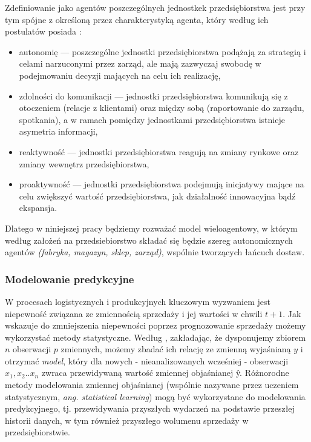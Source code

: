 \documentclass[polish, twoside, 12pt, a4paper]{article}
\theoremstyle{definition}
\theoremstyle{plain}
\theoremstyle{remark}
\begin{document}
Zdefiniowanie jako agentów poszczególnych jednostkek przedsiębiorstwa jest przy tym spójne z określoną przez \cite{Wooldridge1995} charakterystyką agenta, który według ich postulatów posiada : 

	\begin{itemize}
		\item autonomię --- poszczególne jednostki przedsiębiorstwa podążają za strategią i celami narzuconymi przez zarząd, ale mają zazwyczaj swobodę w podejmowaniu decyzji mających na celu ich realizację,
		\item zdolności do komunikacji --- jednostki przedsiębiorstwa komunikują się z otoczeniem (relacje z klientami) oraz między sobą (raportowanie do zarządu, spotkania), a w ramach pomiędzy jednostkami przedsiębiorstwa istnieje asymetria informacji,
		\item reaktywność --- jednostki przedsiębiorstwa reagują na zmiany rynkowe oraz zmiany wewnętrz przedsiębiorstwa,
	 	\item proaktywność --- jednostki przedsiębiorstwa podejmują inicjatywy mające na celu zwiększyć wartość przedsiębiorstwa, jak działalność innowacyjna bądź ekspansja. 
	\end{itemize}
 
 Dlatego w niniejszej pracy będziemy rozważać model wieloagentowy, w którym według założeń na przedsiebiorstwo składać się będzie szereg autonomicznych agentów \textit{(fabryka, magazyn, sklep, zarząd)}, wspólnie tworzących łańcuch dostaw.

\subsubsection{Modelowanie predykcyjne} \label{chapter:statistical} 
W procesach logistycznych i produkcyjnych kluczowym wyzwaniem jest niepewność związana ze zmiennością sprzedaży i jej wartości w chwili $t+1$. Jak wskazuje \cite{James2013} do zmniejszenia niepewności poprzez prognozowanie sprzedaży możemy wykorzystać metody statystyczne. Według \cite{James2013}, zakładając, że dysponujemy zbiorem $n$ obserwacji $p$ zmiennych, możemy zbadać ich relację ze zmienną wyjaśnianą $y$ i otrzymać \textit{model}, który dla nowych - nieanalizowanych wcześniej - obserwacji $x_1,x_2..x_n$  zwraca przewidywaną wartość zmiennej objaśnianej \^{y}. Różnorodne metody modelowania zmiennej objaśnianej (wspólnie nazywane przez \cite{James2013} uczeniem statystycznym, \textit{ang. statistical learning}) mogą być wykorzystane do modelowania predykcyjnego, tj. przewidywania przyszłych wydarzeń na podstawie przeszłej historii danych, w tym również przyszłego wolumenu sprzedaży w przedsiębiorstwie. 
\end{document}
